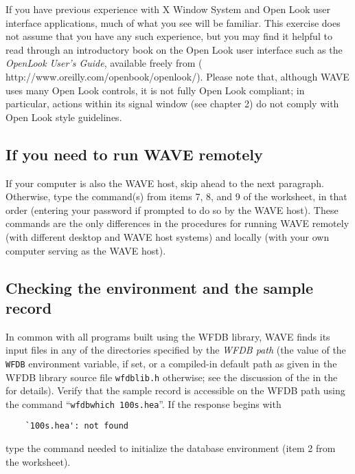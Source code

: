 \documentclass[twoside]{book}
\newcommand{\WAVE}{{\sf WAVE}\xspace}
\begin{document}
{If you have previous experience with X Window System and Open Look
user interface applications, much of what you see will be familiar.
This exercise does not assume that you have any such experience, but
you may find it helpful to read through an introductory book on the
Open Look user interface such as the {\it OpenLook User's Guide},
available freely from
(
{http://www.oreilly.com/openbook/openlook/}).
Please note that, although \WAVE{} uses many Open
Look controls, it is not fully Open Look compliant; in particular,
actions within its signal window (see chapter 2) do not comply with
Open Look style guidelines.}


\subsection*{If you need to run \WAVE{} remotely}

If your computer is also the \WAVE{} host, skip ahead to the next
paragraph.  Otherwise, type the command(s) from items 7, 8, and 9 of
the worksheet, in that order (entering your password if prompted to do
so by the \WAVE{} host).  These commands are the only differences in
the procedures for running \WAVE{} remotely (with different desktop
and \WAVE{} host systems) and locally (with your own computer serving
as the \WAVE{} host).
\index{WAVE host@\WAVE{} host}

\subsection*{Checking the environment and the sample record}

\label{sec:wfdb-path}
In common with all programs built using the WFDB library, \WAVE{} finds its
input files in any of the directories specified by the {\em WFDB path}
(the value of the {\tt WFDB} environment variable, if set, or a compiled-in
default path as given in the WFDB library source file {\tt wfdblib.h}
otherwise; see the discussion of the
in the 
for details).  Verify that the sample record is accessible on the WFDB
path using the command ``{\tt wfdbwhich 100s.hea}''.  If the response
begins with
\begin{verbatim}
    `100s.hea': not found
\end{verbatim}
\noindent
type the command needed to initialize the database environment (item 2 from
the worksheet).
\end{document}
